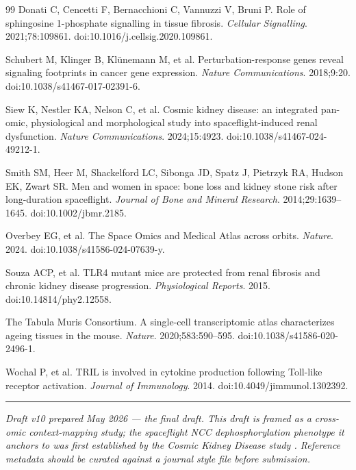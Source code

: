 \documentclass[11pt]{article}
\begin{document}
\begin{thebibliography}{99}
 Donati C, Cencetti F, Bernacchioni C, Vannuzzi V, Bruni P. Role of sphingosine 1-phosphate signalling in tissue fibrosis. \emph{Cellular Signalling}. 2021;78:109861. doi:10.1016/j.cellsig.2020.109861.

 Schubert M, Klinger B, Kl\"unemann M, et al. Perturbation-response genes reveal signaling footprints in cancer gene expression. \emph{Nature Communications}. 2018;9:20. doi:10.1038/s41467-017-02391-6.

 Siew K, Nestler KA, Nelson C, et al. Cosmic kidney disease: an integrated pan-omic, physiological and morphological study into spaceflight-induced renal dysfunction. \emph{Nature Communications}. 2024;15:4923. doi:10.1038/s41467-024-49212-1.

 Smith SM, Heer M, Shackelford LC, Sibonga JD, Spatz J, Pietrzyk RA, Hudson EK, Zwart SR. Men and women in space: bone loss and kidney stone risk after long-duration spaceflight. \emph{Journal of Bone and Mineral Research}. 2014;29:1639--1645. doi:10.1002/jbmr.2185.

 Overbey EG, et al. The Space Omics and Medical Atlas across orbits. \emph{Nature}. 2024. doi:10.1038/s41586-024-07639-y.

 Souza ACP, et al. TLR4 mutant mice are protected from renal fibrosis and chronic kidney disease progression. \emph{Physiological Reports}. 2015. doi:10.14814/phy2.12558.

 The Tabula Muris Consortium. A single-cell transcriptomic atlas characterizes ageing tissues in the mouse. \emph{Nature}. 2020;583:590--595. doi:10.1038/s41586-020-2496-1.

 Wochal P, et al. TRIL is involved in cytokine production following Toll-like receptor activation. \emph{Journal of Immunology}. 2014. doi:10.4049/jimmunol.1302392.

\end{thebibliography}

\vspace{1em}
\begin{center}
\rule{0.4\textwidth}{0.4pt}
\end{center}
\vspace{0.3em}
\noindent\textit{Draft v10 prepared May 2026 --- the final draft. This draft is framed as a cross-omic context-mapping study; the spaceflight NCC dephosphorylation phenotype it anchors to was first established by the Cosmic Kidney Disease study \citep{siew2024cosmic}. Reference metadata should be curated against a journal style file before submission.}
\end{document}
